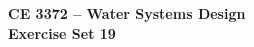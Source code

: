 \documentclass[12pt]{article}
\begin{document}
\begin{center}
{\textbf{{ CE 3372 -- Water Systems Design} \\ {Exercise Set 19}}}
\end{center}

\end{document}
